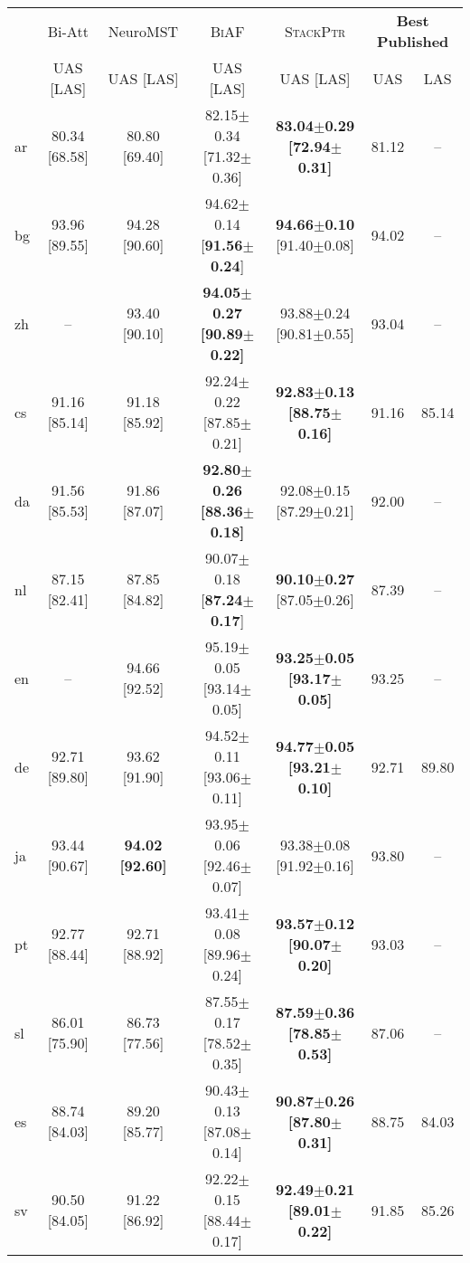 \documentclass[11pt,a4paper]{article}
\begin{document}
\begin{table*}[t]
\centering
{\small
\begin{tabular}[t]{l|c|c|c|c||cc}
\hline
 & \textsf{Bi-Att} & \textsf{NeuroMST} & \textsc{BiAF} & \textsc{StackPtr} & \multicolumn{2}{c}{\textbf{Best Published}} \\
 \cline{2-7}
 & UAS [LAS] & UAS [LAS] & UAS [LAS] & UAS [LAS] & UAS & LAS \\
\hline
ar  & 80.34 [68.58] & 80.80 [69.40] & 82.15$\pm$0.34 [71.32$\pm$0.36] & \textbf{83.04$\pm$0.29 [72.94$\pm$0.31]} & 81.12 & -- \\
bg  & 93.96 [89.55] & 94.28 [90.60] & 94.62$\pm$0.14 [\textbf{91.56$\pm$0.24}] & \textbf{94.66$\pm$0.10} [91.40$\pm$0.08] & 94.02 & -- \\
zh  & --            & 93.40 [90.10] & \textbf{94.05$\pm$0.27 [90.89$\pm$0.22]} & 93.88$\pm$0.24 [90.81$\pm$0.55] & 93.04 & -- \\
cs  & 91.16 [85.14] & 91.18 [85.92] & 92.24$\pm$0.22 [87.85$\pm$0.21] & \textbf{92.83$\pm$0.13 [88.75$\pm$0.16]} & 91.16 & 85.14 \\
da  & 91.56 [85.53] & 91.86 [87.07] & \textbf{92.80$\pm$0.26 [88.36$\pm$0.18]} & 92.08$\pm$0.15 [87.29$\pm$0.21] & 92.00 & -- \\
nl  & 87.15 [82.41] & 87.85 [84.82] & 90.07$\pm$0.18 [\textbf{87.24$\pm$0.17}] & \textbf{90.10$\pm$0.27} [87.05$\pm$0.26] & 87.39 & -- \\
en  & --            & 94.66 [92.52] & 95.19$\pm$0.05 [93.14$\pm$0.05] & \textbf{93.25$\pm$0.05 [93.17$\pm$0.05]} & 93.25 & -- \\
de  & 92.71 [89.80] & 93.62 [91.90] & 94.52$\pm$0.11 [93.06$\pm$0.11] & \textbf{94.77$\pm$0.05 [93.21$\pm$0.10]} & 92.71 & 89.80 \\
ja  & 93.44 [90.67] & \textbf{94.02 [92.60]} & 93.95$\pm$0.06 [92.46$\pm$0.07] & 93.38$\pm$0.08 [91.92$\pm$0.16] & 93.80 & -- \\
pt  & 92.77 [88.44] & 92.71 [88.92] & 93.41$\pm$0.08 [89.96$\pm$0.24] & \textbf{93.57$\pm$0.12 [90.07$\pm$0.20]} & 93.03 & -- \\
sl  & 86.01 [75.90] & 86.73 [77.56] & 87.55$\pm$0.17 [78.52$\pm$0.35] & \textbf{87.59$\pm$0.36 [78.85$\pm$0.53]} & 87.06 & -- \\
es  & 88.74 [84.03] & 89.20 [85.77] & 90.43$\pm$0.13 [87.08$\pm$0.14] & \textbf{90.87$\pm$0.26 [87.80$\pm$0.31]} & 88.75 & 84.03 \\
sv  & 90.50 [84.05] & 91.22 [86.92] & 92.22$\pm$0.15 [88.44$\pm$0.17] & \textbf{92.49$\pm$0.21 [89.01$\pm$0.22]} & 91.85 & 85.26 \\

\end{tabular}}
\end{table*}
\end{document}
